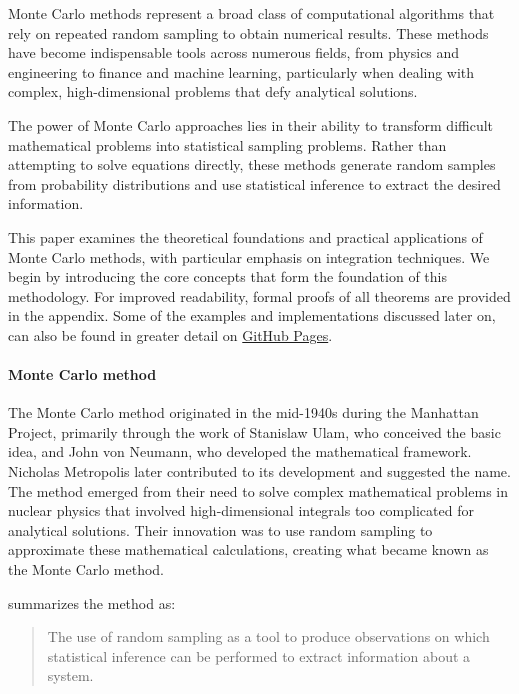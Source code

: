Monte Carlo methods represent a broad class of computational algorithms that rely on repeated random sampling to obtain numerical results. These methods have become indispensable tools across numerous fields, from physics and engineering to finance and machine learning, particularly when dealing with complex, high-dimensional problems that defy analytical solutions.

The power of Monte Carlo approaches lies in their ability to transform difficult mathematical problems into statistical sampling problems. Rather than attempting to solve equations directly, these methods generate random samples from probability distributions and use statistical inference to extract the desired information.

This paper examines the theoretical foundations and practical applications of Monte Carlo methods, with particular emphasis on integration techniques. We begin by introducing the core concepts that form the foundation of this methodology. For improved readability, formal proofs of all theorems are provided in the appendix. Some of the examples and implementations discussed later on, can also be found in greater detail on \href{https://nikogerman.github.io/Seminar/index.html}{\color{blue}GitHub Pages}.


\paragraph{Monte Carlo method}
The Monte Carlo method originated in the mid-1940s during the Manhattan Project, primarily through the work of Stanislaw Ulam, who conceived the basic idea, and John von Neumann, who developed the mathematical framework. Nicholas Metropolis later contributed to its development and suggested the name. The method emerged from their need to solve complex mathematical problems in nuclear physics that involved high-dimensional integrals too complicated for analytical solutions. Their innovation was to use random sampling to approximate these mathematical calculations, creating what became known as the Monte Carlo method.

\cite{lemieux_monte_2009} summarizes the method as:
\begin{quote}
The use of random sampling as a tool to produce
observations on which statistical inference can be performed to extract information about a system.
\end{quote}

